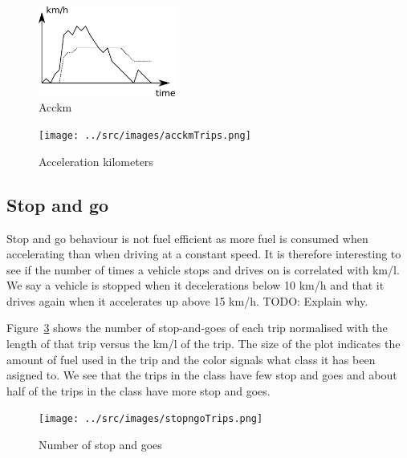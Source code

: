 \begin{figure}[htb]
\centering
\includegraphics[width=0.4\textwidth]{../images/acckm.png}
\caption{Acckm}
\label{fig:acckm}
\end{figure}

\begin{figure}
\centering
\texttt{[image: ../src/images/acckmTrips.png]}
\caption{Acceleration kilometers}
\label{fig:acckmTrips}
\end{figure}

\subsection{Stop and go}
Stop and go behaviour is not fuel efficient as more fuel is consumed when accelerating than when driving at a constant speed.
It is therefore interesting to see if the number of times a vehicle stops and drives on is correlated with km/l.
We say a vehicle is stopped when it decelerations below 10 km/h and that it drives again when it accelerates up above 15 km/h.
TODO: Explain why.


Figure~\ref{fig:stopngoTrips} shows the number of stop-and-goes of each trip normalised with the length of that trip versus the km/l of the trip.
The size of the plot indicates the amount of fuel used in the trip and the color signals what class it has been asigned to.
We see that the trips in the \fuelHigh class have few stop and goes and about half of the trips in the \fuelMedium class have more stop and goes.

\begin{figure}
\centering
\texttt{[image: ../src/images/stopngoTrips.png]}
\caption{Number of stop and goes}
\label{fig:stopngoTrips}
\end{figure}
